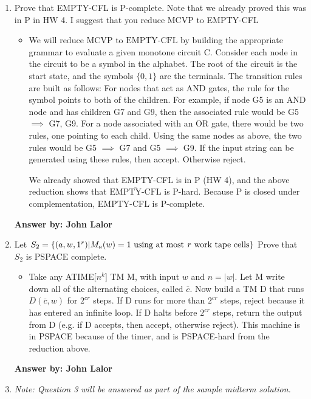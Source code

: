 \documentclass[12pt]{article}
\begin{document}
\noindent{}
\addtocounter{section}{1}

\begin{enumerate}

\item Prove that EMPTY-CFL is P-complete. Note that we already proved this was in P in HW 4. I suggest that you reduce MCVP to EMPTY-CFL

\begin{itemize}

\item We will reduce MCVP to $\overline{\textrm{EMPTY-CFL}}$ by building the appropriate grammar to evaluate a given monotone circuit C. Consider each node in the circuit to be a symbol in the alphabet. The root of the circuit is the start state, and the symbols $\{0,1\}$ are the terminals. The transition rules are built as follows: For nodes that act as AND gates, the rule for the symbol points to both of the children. For example, if node G5 is an AND node and has children G7 and G9, then the associated rule would be G5 $\implies$ G7, G9. For a node associated with an OR gate, there would be two rules, one pointing to each child. Using the same nodes as above, the two rules would be G5 $\implies$ G7 and G5 $\implies$ G9. If the input string can be generated using these rules, then accept. Otherwise reject.

We already showed that EMPTY-CFL is in P (HW 4), and the above reduction shows that $\overline{\textrm{EMPTY-CFL}}$ is P-hard. Because P is closed under complementation, EMPTY-CFL is P-complete.

\end{itemize}

{\bf Answer by: John Lalor} 

\item Let $S_2 = \{(a,w,1^r) | M_a(w) = 1 \textrm{ using at most \textit{r} work tape cells}\}$ Prove that $S_2$ is PSPACE complete.


\begin{itemize}

\item Take any ATIME[$n^k$] TM M, with input $w$ and $n = |w|$. Let M write down all of the alternating choices, called $\bar{c}$. Now build a TM D that runs $D(\bar{c},w)$ for $2^{cr}$ steps. If D runs for more than $2^{cr}$ steps, reject because it has entered an infinite loop. If D halts before $2^{cr}$ steps, return the output from D (e.g. if D accepts, then accept, otherwise reject). This machine is in PSPACE because of the timer, and is PSPACE-hard from the reduction above. 

\end{itemize}


{\bf Answer by: John Lalor} 

\item \textit{Note: Question 3 will be answered as part of the sample midterm solution.}

\end{enumerate}
\end{document}

